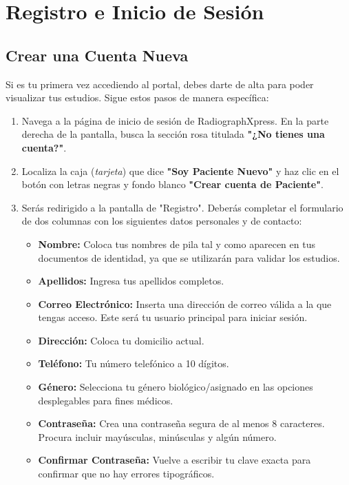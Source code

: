 \section{Registro e Inicio de Sesión}

\subsection{Crear una Cuenta Nueva}
Si es tu primera vez accediendo al portal, debes darte de alta para poder visualizar tus estudios. Sigue estos pasos de manera específica:

\begin{enumerate}
    \item Navega a la página de inicio de sesión de RadiographXpress. En la parte derecha de la pantalla, busca la sección rosa titulada \textbf{"¿No tienes una cuenta?"}.
    \item Localiza la caja (\textit{tarjeta}) que dice \textbf{"Soy Paciente Nuevo"} y haz clic en el botón con letras negras y fondo blanco \textbf{"Crear cuenta de Paciente"}.
    \item Serás redirigido a la pantalla de "Registro". Deberás completar el formulario de dos columnas con los siguientes datos personales y de contacto:
    \begin{itemize}
        \item \textbf{Nombre:} Coloca tus nombres de pila tal y como aparecen en tus documentos de identidad, ya que se utilizarán para validar los estudios.
        \item \textbf{Apellidos:} Ingresa tus apellidos completos.
        \item \textbf{Correo Electrónico:} Inserta una dirección de correo válida a la que tengas acceso. Este será tu usuario principal para iniciar sesión.
        \item \textbf{Dirección:} Coloca tu domicilio actual.
        \item \textbf{Teléfono:} Tu número telefónico a 10 dígitos.
        \item \textbf{Género:} Selecciona tu género biológico/asignado en las opciones desplegables para fines médicos.
        \item \textbf{Contraseña:} Crea una contraseña segura de al menos 8 caracteres. Procura incluir mayúsculas, minúsculas y algún número.
        \item \textbf{Confirmar Contraseña:} Vuelve a escribir tu clave exacta para confirmar que no hay errores tipográficos.
    \end{itemize}

\end{enumerate}
